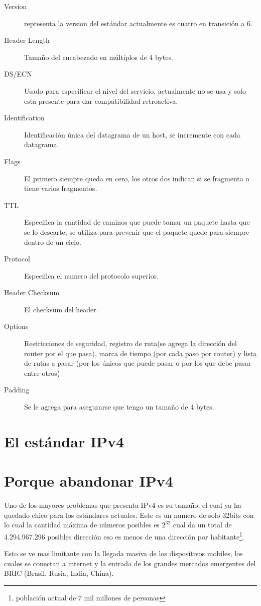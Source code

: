 \documentclass[11pt,a4paper]{article}
\begin{document}
\begin{description}

\item[Version] representa la version del estándar actualmente es cuatro en transición a 6.
\item[Header Length] Tamaño del encabezado en múltiplos de 4 bytes.
\item[DS/ECN] Usado para especificar el nivel del servicio, actualmente no se usa y solo esta
presente para dar compatibilidad retroactiva.
\item[Identification] Identificación única del datagrama de un host, se incremente con cada 
datagrama.
\item[Flags] El primero siempre queda en cero, los otros dos indican si se fragmenta o tiene varios
fragmentos.
\item[TTL] Especifica la cantidad de caminos que puede tomar un paquete hasta que se lo descarte, se
utiliza para prevenir que el paquete quede para siempre dentro de un ciclo.
\item[Protocol] Especifica el numero del protocolo superior.
\item[Header Checksum] El checksum del header.
\item[Options] Restricciones de seguridad, registro de ruta(se agrega la dirección del router por el 
que pasa), marca de tiempo (por cada paso por router) y lista de rutas a pasar (por los únicos que 
puede pasar o por los que debe pasar entre otros)
\item[Padding] Se le agrega para asegurarse que tengo un tamaño de 4 bytes.

\end{description}


\section{El estándar IPv4}

\section{Porque abandonar IPv4}
Uno de los mayores problemas que presenta IPv4 es su tamaño, el cual ya ha quedado chico para los
estándares actuales. Este es un numero de solo 32bits con lo cual la cantidad máxima de números
posibles es $2^{32}$ cual da un total de 4.294.967.296 posibles dirección eso es menos de una
dirección por habitante\footnote{población actual de 7 mil millones de personas}.\par
Esto se ve mas limitante con la llegada masiva de los dispositivos mobiles, los cuales se conectan
a internet y la entrada de los grandes mercados emergentes del BRIC (Brasil, Rusia, India, China).
 
\end{document}
